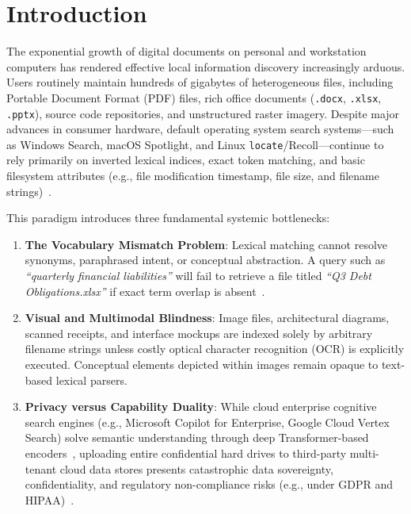 \documentclass[pdflatex,sn-mathphys-num]{sn-jnl}%
\theoremstyle{thmstyleone}%
\theoremstyle{thmstyletwo}%
\theoremstyle{thmstylethree}%
\begin{document}

\maketitle

\section{Introduction}\label{sec1}

The exponential growth of digital documents on personal and workstation computers has rendered effective local information discovery increasingly arduous. Users routinely maintain hundreds of gigabytes of heterogeneous files, including Portable Document Format (PDF) files, rich office documents (\texttt{.docx}, \texttt{.xlsx}, \texttt{.pptx}), source code repositories, and unstructured raster imagery. Despite major advances in consumer hardware, default operating system search systems---such as Windows Search, macOS Spotlight, and Linux \texttt{locate}/Recoll---continue to rely primarily on inverted lexical indices, exact token matching, and basic filesystem attributes (e.g., file modification timestamp, file size, and filename strings)~\cite{baeza1999modern,manning2008introduction}.

This paradigm introduces three fundamental systemic bottlenecks:
\begin{enumerate}
    \item \textbf{The Vocabulary Mismatch Problem}: Lexical matching cannot resolve synonyms, paraphrased intent, or conceptual abstraction. A query such as \textit{``quarterly financial liabilities''} will fail to retrieve a file titled \textit{``Q3 Debt Obligations.xlsx''} if exact term overlap is absent~\cite{furnas1987vocabulary}.
    \item \textbf{Visual and Multimodal Blindness}: Image files, architectural diagrams, scanned receipts, and interface mockups are indexed solely by arbitrary filename strings unless costly optical character recognition (OCR) is explicitly executed. Conceptual elements depicted within images remain opaque to text-based lexical parsers.
    \item \textbf{Privacy versus Capability Duality}: While cloud enterprise cognitive search engines (e.g., Microsoft Copilot for Enterprise, Google Cloud Vertex Search) solve semantic understanding through deep Transformer-based encoders~\cite{vaswani2017attention}, uploading entire confidential hard drives to third-party multi-tenant cloud data stores presents catastrophic data sovereignty, confidentiality, and regulatory non-compliance risks (e.g., under GDPR and HIPAA)~\cite{voigt2017eu}.
\end{enumerate}
\end{document}
